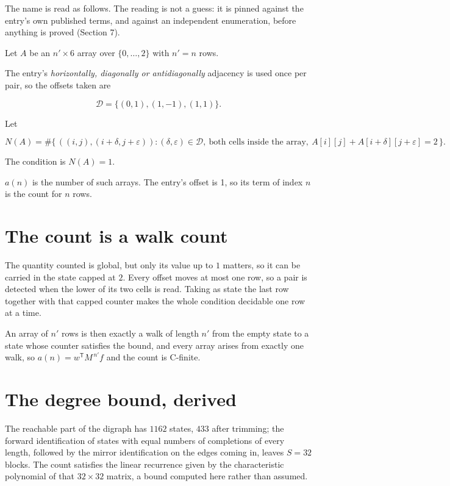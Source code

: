 \documentclass[11pt]{article}
\theoremstyle{definition}
\begin{document}
The name is read as follows. The reading is not a guess: it is pinned against the entry's own published terms, and against an independent enumeration, before anything is proved (Section 7).

Let $A$ be an $n' \times 6$ array over $\{0,\dots,2\}$ with $n' = n$ rows.

The entry's {\itshape horizontally, diagonally or antidiagonally} adjacency is used once per pair, so the offsets taken are

\[\mathcal{D} = \{(0,1), (1,-1), (1,1)\}.\]

Let

\[N(A) = \#\bigl\{\,((i,j),(i{+}\delta,j{+}\varepsilon)) : (\delta,\varepsilon) \in \mathcal{D},\ \text{both cells inside the array},\ A[i][j] + A[i{+}\delta][j{+}\varepsilon] = 2\,\bigr\}.\]

The condition is $N(A) = 1$.

$a(n)$ is the number of such arrays. The entry's offset is 1, so its term of index $n$ is the count for $n$ rows.

\section{The count is a walk count}

The quantity counted is global, but only its value up to $1$ matters, so it can be carried in the state capped at $2$. Every offset moves at most one row, so a pair is detected when the lower of its two cells is read. Taking as state the last row together with that capped counter makes the whole condition decidable one row at a time.

An array of $n'$ rows is then exactly a walk of length $n'$ from the empty state to a state whose counter satisfies the bound, and every array arises from exactly one walk, so $a(n) = w^{\mathsf T}M^{\,n'}f$ and the count is C-finite.

\section{The degree bound, derived}

The reachable part of the digraph has $1162$ states, $433$ after trimming; the forward identification of states with equal numbers of completions of every length, followed by the mirror identification on the edges coming in, leaves $S = 32$ blocks. The count satisfies the linear recurrence given by the characteristic polynomial of that $32\times32$ matrix, a bound computed here rather than assumed.
\end{document}
